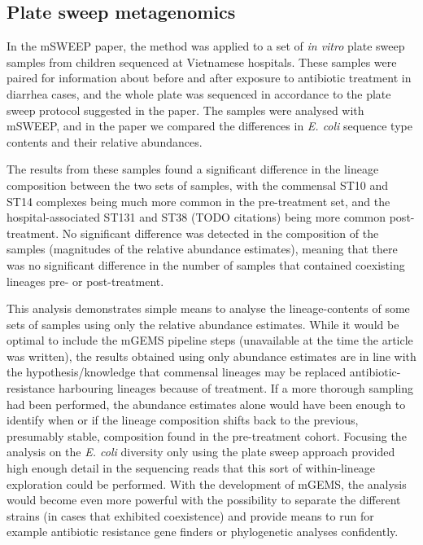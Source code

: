 \documentclass[officiallayout]{tktla}
\begin{document}
\subsection{Plate sweep metagenomics}

In the mSWEEP paper, the method was applied to a set of \textit{in
  vitro} plate sweep samples from children sequenced at Vietnamese
hospitals. These samples were paired for information about before and
after exposure to antibiotic treatment in diarrhea cases, and the
whole plate was sequenced in accordance to the plate sweep protocol
suggested in the paper. The samples were analysed with mSWEEP, and in
the paper we compared the differences in \textit{E. coli} sequence
type contents and their relative abundances.

The results from these samples found a significant difference in the
lineage composition between the two sets of samples, with the
commensal ST10 and ST14 complexes being much more common in the
pre-treatment set, and the hospital-associated ST131 and ST38 (TODO
citations) being more common post-treatment. No significant difference
was detected in the composition of the samples (magnitudes of the
relative abundance estimates), meaning that there was no significant difference in
the number of samples that contained coexisting lineages pre- or post-treatment.

This analysis demonstrates simple means to analyse the
lineage-contents of some sets of samples using only the relative
abundance estimates. While it would be optimal to include the mGEMS
pipeline steps (unavailable at the time the article was written), the
results obtained using only abundance estimates are in line with the
hypothesis/knowledge that commensal lineages may be replaced
antibiotic-resistance harbouring lineages because of treatment. If a
more thorough sampling had been performed, the abundance estimates
alone would have been enough to identify when or if the lineage
composition shifts back to the previous, presumably stable,
composition found in the pre-treatment cohort. Focusing the analysis
on the \textit{E. coli} diversity only using the plate sweep approach
provided high enough detail in the sequencing reads that this sort of
within-lineage exploration could be performed. With the development of
mGEMS, the analysis would become even more powerful with the
possibility to separate the different strains (in cases that exhibited
coexistence) and provide means to run for example antibiotic
resistance gene finders or phylogenetic analyses confidently.
\end{document}
